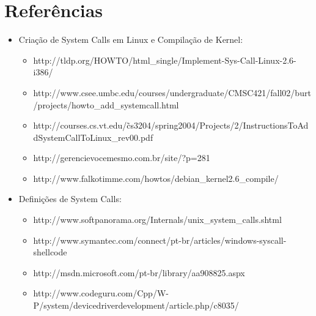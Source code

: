 \documentclass{article}
\begin{document}
\begin{verbatim}

\end{verbatim}










\section{Referências}

\begin{itemize}

	\item Criação de System Calls em Linux e Compilação de Kernel:
	
	\begin{itemize}
	
		\item http://tldp.org/HOWTO/html\_single/Implement-Sys-Call-Linux-2.6-i386/
		\item http://www.csee.umbc.edu/courses/undergraduate/CMSC421/fall02/burt/projects/howto\_add\_systemcall.html
		\item http://courses.cs.vt.edu/\~cs3204/spring2004/Projects/2/InstructionsToAddSystemCallToLinux\_rev00.pdf
		\item http://gerencievocemesmo.com.br/site/?p=281
		\item http://www.falkotimme.com/howtos/debian\_kernel2.6\_compile/
	
	\end{itemize}
	
	
	\item Definições de System Calls:
	
	\begin{itemize}
	
		\item http://www.softpanorama.org/Internals/unix\_system\_calls.shtml
		\item http://www.symantec.com/connect/pt-br/articles/windows-syscall-shellcode
		\item http://msdn.microsoft.com/pt-br/library/aa908825.aspx
		\item http://www.codeguru.com/Cpp/W-P/system/devicedriverdevelopment/article.php/c8035/
	
	\end{itemize}

\end{itemize}
\end{document}
